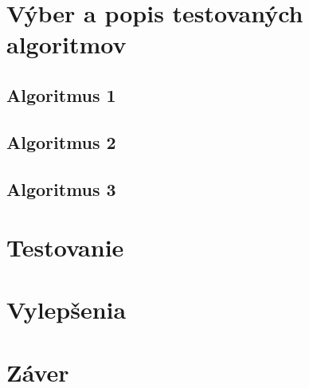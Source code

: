 \documentclass[a4paper,11pt,final]{report}
\begin{document}
\chapter{Výber a popis testovaných algoritmov}
\section{Algoritmus 1}
\section{Algoritmus 2}
\section{Algoritmus 3}
\chapter{Testovanie}
\chapter{Vylepšenia}
\chapter{Záver}
\newpage
{}
\begin{thebibliography}{blablablabla}
\end{thebibliography}
\end{document}
